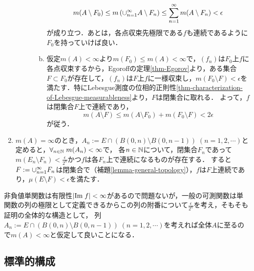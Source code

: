 \documentclass[uplatex, dvipdfmx]{jsreport}
\begin{document}
\begin{Proof}
\begin{enumerate}
\begin{description}
\begin{enumerate}[(a)]
                \[m(A\setminus F_0)\le m\left(\cup_{n=1}^\infty A\setminus F_n\right)\le\sum_{n=1}^\infty m(A\setminus F_n)<\epsilon\]
                が成り立つ．あとは，各点収束先極限である$f$も連続であるように$F_0$を持っていけば良い．
                \item 仮定$m(A)<\infty$より$m(F_0)\le m(A)<\infty$で，$(f_n)$は$F_0$上$f$に各点収束するから，Egoroffの定理\ref{thm-Egorov}より，ある集合$F\subset F_0$が存在して，$(f_n)$は$F$上$f$に一様収束し，$m(F_0\setminus F)<\epsilon$を満たす．特にLebesgue測度の位相的正則性\ref{thm-characterization-of-Lebesgue-measurableness}より，$F$は閉集合に取れる．
                よって，$f$は閉集合$F$上で連続であり，
                \[m(A\setminus F)\le m(A\setminus F_0)+m(F_0\setminus F)<2\epsilon\]
                が従う．
            \end{enumerate}
        \end{description}
        \item $m(A)=\infty$のとき，$A_n:=E\cap(B(0,n)\setminus B(0,n-1))\;(n=1,2,\cdots)$と定めると，$\forall_{n\in\mathbb{N}}\;m(A_n)<\infty$で，
        各$n\in\mathbb{N}$について，閉集合$F_n$であって$m(E_n\setminus F_n)<\frac{\epsilon}{2^n}$かつ$f$は各$F_n$上で連続になるものが存在する．
        すると$F:=\cup_{n=1}^\infty F_n$は閉集合で（補題\ref{lemma-general-topology}），$f$は$F$上連続であり，$\mu(E\setminus F)<\epsilon$を満たす．
    \end{enumerate}
\end{Proof}
\begin{remarks}[測度論の議論の仕方の特徴がよく出ている]
    非負値単関数は有限性$\lvert\mathrm{Im}\; f\rvert<\infty$があるので問題ないが，一般の可測関数は単関数の列の極限として定義できるからこの列の附番について$\frac{\epsilon}{2^n}$を考え，そもそも証明の全体的な構造として，
    列$A_n:=E\cap(B(0,n)\setminus B(0,n-1))\;(n=1,2,\cdots)$を考えれば全体$A$に至るので$m(A)<\infty$と仮定して良いことになる．
\end{remarks}

\subsection{標準的構成}
\end{document}
